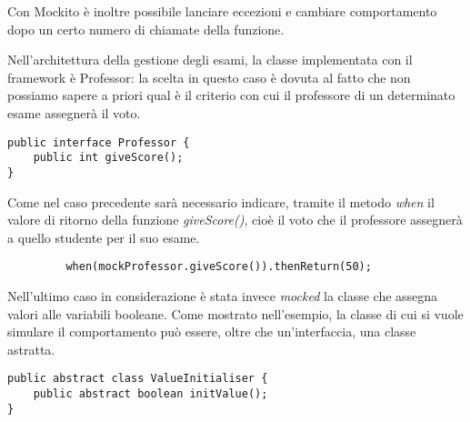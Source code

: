 Con Mockito è inoltre possibile lanciare eccezioni e cambiare comportamento dopo un certo numero di chiamate della funzione.


Nell'architettura della gestione degli esami, la classe implementata con il framework è Professor: la scelta in questo caso è dovuta al fatto che non possiamo sapere a priori qual è il criterio con cui il professore di un determinato esame assegnerà il voto. 

\begin{lstlisting}
public interface Professor {
	public int giveScore();	
}
\end{lstlisting}

Come nel caso precedente sarà necessario indicare, tramite il metodo \emph{when} il valore di ritorno della funzione \emph{giveScore()}, cioè il voto che il professore assegnerà a quello studente per il suo esame.

\begin{lstlisting}
		 when(mockProfessor.giveScore()).thenReturn(50);
\end{lstlisting}


Nell'ultimo caso in considerazione è stata invece \emph{mocked} la classe che assegna valori alle variabili booleane. Come mostrato nell'esempio, la classe di cui si vuole simulare il comportamento può essere, oltre che un'interfaccia, una classe astratta.

\begin{lstlisting}
public abstract class ValueInitialiser {
	public abstract boolean initValue();	
}
\end{lstlisting}